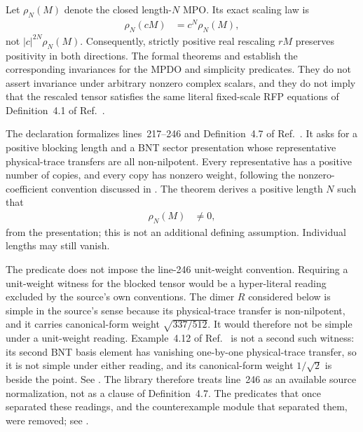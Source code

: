 \documentclass{article}
\begin{document}
Let $\rho_N(M)$ denote the closed length-$N$ MPO. Its exact scaling law is
\begin{align}
    \rho_N(cM)
    &=c^N\rho_N(M),
    \label{eq:uw_closed_mpo_scaling}
\end{align}
not $|c|^{2N}\rho_N(M)$. Consequently, strictly positive real rescaling $rM$
preserves positivity in both directions. The formal theorems
 and
 establish the corresponding
invariances for the MPDO and simplicity predicates. They do not assert
invariance under arbitrary nonzero complex scalars, and they do not imply that
the rescaled tensor satisfies the same literal fixed-scale RFP equations of
Definition~4.1 of Ref.~\cite{Cirac2016MPDO_arXiv}.

The declaration  formalizes lines~217--246 and
Definition~4.7 of Ref.~\cite{Cirac2016MPDO_arXiv}. It asks for a positive
blocking length and a BNT sector presentation whose representative
physical-trace transfers are all non-nilpotent. Every representative has a
positive number of copies, and every copy has nonzero weight, following the
nonzero-coefficient convention discussed in
. The theorem
 derives a positive length $N$
such that
\begin{align}
    \rho_N(M)
    &\ne0,
    \label{eq:uw_positive_length_nonzero}
\end{align}
from the presentation; this is not an additional defining assumption.
Individual lengths may still vanish.

The predicate does not impose the line-246 unit-weight convention. Requiring a
unit-weight witness for the blocked tensor would be a hyper-literal reading
excluded by the source's own conventions. The dimer $R$ considered below is
simple in the source's sense because its physical-trace transfer is
non-nilpotent, and it carries canonical-form weight
$\sqrt{337/512}$. It would therefore not be simple under a unit-weight reading.
Example~4.12 of Ref.~\cite{Cirac2016MPDO_arXiv} is not a second such witness:
its second BNT basis element has vanishing one-by-one physical-trace transfer,
so it is not simple under either reading, and its canonical-form weight
$1/\sqrt2$ is beside the point. See
. The library
therefore treats line~246 as an available source normalization, not as a clause
of Definition~4.7. The predicates that once separated these readings, and the
counterexample module that separated them, were removed; see
.
\end{document}
